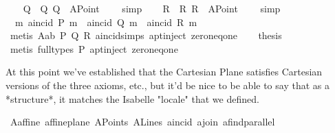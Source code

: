 \begin{isabellebody}
\ \ \isamarkupfalse%
\ Q\ \ Q{\isacharcolon}{\kern0pt}\ {\isachardoublequoteopen}Q\ {\isacharequal}{\kern0pt}\ {\isacharparenleft}{\kern0pt}A{}Point\ {}\ {}{\isacharparenright}{\kern0pt}{\isachardoublequoteclose}\ \isamarkupfalse%
\ simp\isanewline
\ \ \isamarkupfalse%
\ R\ \ R{\isacharcolon}{\kern0pt}\ {\isachardoublequoteopen}R\ {\isacharequal}{\kern0pt}\ {\isacharparenleft}{\kern0pt}A{}Point\ {}\ {}{\isacharparenright}{\kern0pt}{\isachardoublequoteclose}\ \isamarkupfalse%
\ simp\isanewline
\isanewline
\ \ \isamarkupfalse%
\ {\isachardoublequoteopen}{\isacharparenleft}{\kern0pt}{\isasymnexists}\ m{\isachardot}{\kern0pt}\ a{}incid\ P\ m\ {\isasymand}\ a{}incid\ Q\ m\ {\isasymand}\ a{}incid\ R\ m{\isacharparenright}{\kern0pt}{\isachardoublequoteclose}\isanewline
\ \ \ \ \isamarkupfalse%
\ {\isacharparenleft}{\kern0pt}metis\ A{}{\isacharunderscore}{\kern0pt}a{}b\ P\ Q\ R\ a{}incid{\isachardot}{\kern0pt}simps{\isacharparenleft}{\kern0pt}{}{\isacharparenright}{\kern0pt}\ a{}pt{\isachardot}{\kern0pt}inject\ zero{\isacharunderscore}{\kern0pt}neq{\isacharunderscore}{\kern0pt}one{\isacharparenright}{\kern0pt}\isanewline
\isanewline
\ \ \isamarkupfalse%
\ {\isacharquery}{\kern0pt}thesis\ \isanewline
\ \ \isamarkupfalse%
\ {\isacharparenleft}{\kern0pt}metis\ {\isacharparenleft}{\kern0pt}full{\isacharunderscore}{\kern0pt}types{\isacharparenright}{\kern0pt}\ P\ a{}pt{\isachardot}{\kern0pt}inject\ zero{\isacharunderscore}{\kern0pt}neq{\isacharunderscore}{\kern0pt}one{\isacharparenright}{\kern0pt}\isanewline
{}\isamarkupfalse%
%
\endisatagproof
{\isafoldproof}%
%
\isadelimproof
%
\endisadelimproof
%
\begin{isamarkuptext}%
\done \done%
\end{isamarkuptext}\isamarkuptrue%
%
\begin{isamarkuptext}%
At this point we've established that the Cartesian Plane satisfies Cartesian 
versions of the three axioms, etc., but it'd be nice to be able to say that as
a *structure*, it matches the Isabelle "locale" that we defined. \caleb \seiji%
\end{isamarkuptext}\isamarkuptrue%
\isamarkupfalse%
\ A{}{\isacharunderscore}{\kern0pt}affine{\isacharcolon}{\kern0pt}\ {\isachardoublequoteopen}affine{\isacharunderscore}{\kern0pt}plane\ A{}Points\ A{}Lines\ a{}incid\ a{}join\ a{}find{\isacharunderscore}{\kern0pt}parallel{\isachardoublequoteclose}\isanewline

\end{isabellebody}
